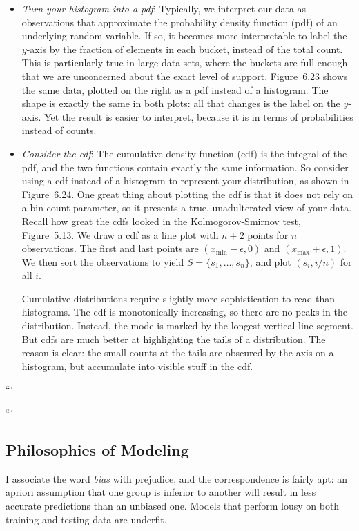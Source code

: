 \documentclass[10pt]{article}
\begin{document}
\begin{itemize}
  \item \textit{Turn your histogram into a pdf}: Typically, we interpret our data as observations that approximate the probability density function (pdf) of an underlying random variable. If so, it becomes more interpretable to label the $y$-axis by the fraction of elements in each bucket, instead of the total count. This is particularly true in large data sets, where the buckets are full enough that we are unconcerned about the exact level of support. Figure~6.23 shows the same data, plotted on the right as a pdf instead of a histogram. The shape is exactly the same in both plots: all that changes is the label on the $y$-axis. Yet the result is easier to interpret, because it is in terms of probabilities instead of counts.
  \item \textit{Consider the cdf}: The cumulative density function (cdf) is the integral of the pdf, and the two functions contain exactly the same information. So consider using a cdf instead of a histogram to represent your distribution, as shown in Figure~6.24. One great thing about plotting the cdf is that it does not rely on a bin count parameter, so it presents a true, unadulterated view of your data. Recall how great the cdfs looked in the Kolmogorov-Smirnov test, Figure~5.13. We draw a cdf as a line plot with $n+2$ points for $n$ observations. The first and last points are $(x_{\min} - \epsilon, 0)$ and $(x_{\max} + \epsilon, 1)$. We then sort the observations to yield $S = \{s_{1}, \ldots, s_{n}\}$, and plot $(s_{i}, i/n)$ for all $i$.

Cumulative distributions require slightly more sophistication to read than histograms. The cdf is monotonically increasing, so there are no peaks in the distribution. Instead, the mode is marked by the longest vertical line segment. But cdfs are much better at highlighting the tails of a distribution. The reason is clear: the small counts at the tails are obscured by the axis on a histogram, but accumulate into visible stuff in the cdf.
\end{itemize}
```

```
\subsection{Philosophies of Modeling}

I associate the word \textit{bias} with prejudice, and the correspondence is fairly apt: an apriori assumption that one group is inferior to another will result in less accurate predictions than an unbiased one. Models that perform lousy on both training and testing data are underfit.
\end{document}
